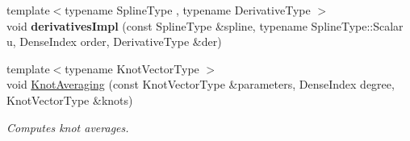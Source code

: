 \begin{DoxyCompactItemize}
\item 
\mbox{\label{namespace_eigen_ae8ed4b8aebde67ffb90eafe2d29dd969}} 
{\footnotesize template$<$typename Spline\+Type , typename Derivative\+Type $>$ }\\void {\bfseries derivatives\+Impl} (const Spline\+Type \&spline, typename Spline\+Type\+::\+Scalar u, Dense\+Index order, Derivative\+Type \&der)
\item 
{\footnotesize template$<$typename Knot\+Vector\+Type $>$ }\\void \hyperlink{group___splines___module_ga9474da5ed68bbd9a6788a999330416d6}{Knot\+Averaging} (const Knot\+Vector\+Type \&parameters, Dense\+Index degree, Knot\+Vector\+Type \&knots)
\begin{DoxyCompactList}\small\item\em Computes knot averages.


\end{DoxyCompactList}
\end{DoxyCompactItemize}
